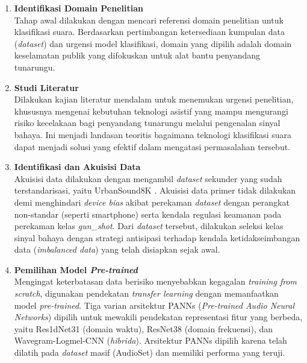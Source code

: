 \begin{enumerate}
    \item \textbf{Identifikasi Domain Penelitian} \\
    Tahap awal dilakukan dengan mencari referensi domain penelitian untuk klasifikasi suara. Berdasarkan pertimbangan ketersediaan kumpulan data (\textit{dataset}) dan urgensi model klasifikasi, domain yang dipilih adalah domain keselamatan publik yang difokuskan untuk alat bantu penyandang tunarungu.

    \item \textbf{Studi Literatur} \\
    Dilakukan kajian literatur mendalam untuk menemukan urgensi penelitian, khususnya mengenai kebutuhan teknologi asistif yang mampu mengurangi risiko kecelakaan bagi penyandang tunarungu melalui pengenalan sinyal bahaya. Ini menjadi landasan teoritis bagaimana teknologi klasifikasi suara dapat menjadi solusi yang efektif dalam mengatasi permasalahan tersebut.

    \item \textbf{Identifikasi dan Akuisisi Data} \\
    Akuisisi data dilakukan dengan mengambil \textit{dataset} sekunder yang sudah terstandarisasi, yaitu UrbanSound8K \cite{salamon2014dataset}. Akuisisi data primer tidak dilakukan demi menghindari \textit{device bias} akibat perekaman \textit{dataset} dengan perangkat non-standar (seperti smartphone) serta kendala regulasi keamanan pada perekaman kelas \textit{gun\_shot}. Dari \textit{dataset} tersebut, dilakukan seleksi kelas sinyal bahaya dengan strategi antisipasi terhadap kendala ketidakseimbangan data (\textit{imbalanced data}) yang telah disiapkan sejak awal.    

    \item \textbf{Pemilihan Model \textit{Pre-trained}} \\
    Mengingat keterbatasan data berisiko menyebabkan kegagalan \textit{training from scratch}, digunakan pendekatan \textit{transfer learning} dengan memanfaatkan model \textit{pre-trained}.
    Tiga varian arsitektur PANNs (\textit{Pre-trained Audio Neural Networks}) \cite{kong2020panns} dipilih untuk mewakili pendekatan representasi fitur yang berbeda, yaitu Res1dNet31 (domain waktu), ResNet38 (domain frekuensi), dan Wavegram-Logmel-CNN (\textit{hibrida}). 
    Arsitektur PANNs dipilih karena telah dilatih pada \textit{dataset} masif (AudioSet) dan memiliki performa yang teruji. \par


\end{enumerate}
